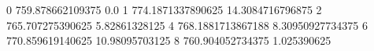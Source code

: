 0 759.878662109375 0.0
1 774.1871337890625 14.3084716796875
2 765.707275390625 5.82861328125
4 768.1881713867188 8.30950927734375
6 770.859619140625 10.98095703125
8 760.904052734375 1.025390625
